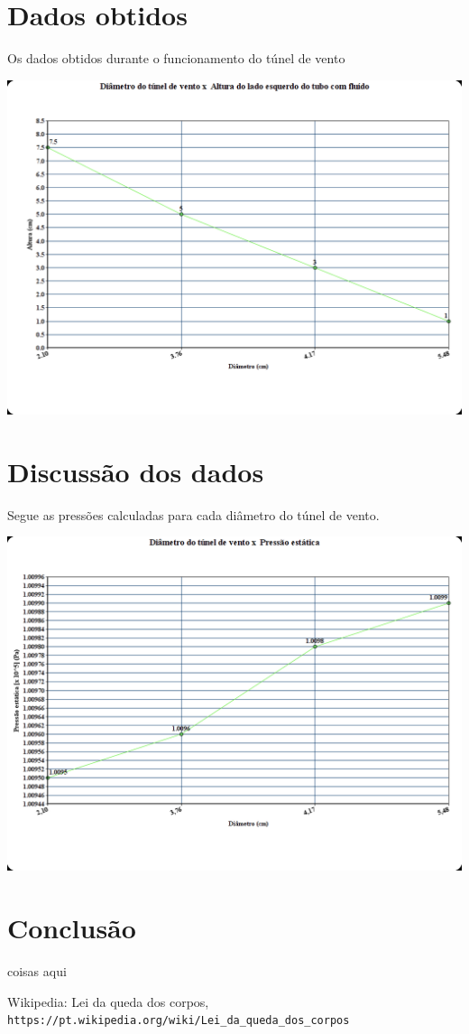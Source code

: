 \documentclass[a4paper]{article}
\begin{document}
\section{Dados obtidos}
    Os dados obtidos durante o funcionamento do túnel de vento
    \begin{center}
          \includegraphics[width=\linewidth]{img/graphHeight.png}
          \label{graph}
    \end{center}


\section{Discussão dos dados}
    Segue as pressões calculadas para cada diâmetro do túnel de vento.
        \begin{center}
              \includegraphics[width=\linewidth]{img/graphPression.png}
              \label{graph}
        \end{center}

\section{Conclusão}
    coisas aqui

\begin{thebibliography}{1}

    Wikipedia: Lei da queda dos corpos,
    \\\texttt{https://pt.wikipedia.org/wiki/Lei\_da\_queda\_dos\_corpos}
\end{thebibliography}
\end{document}
